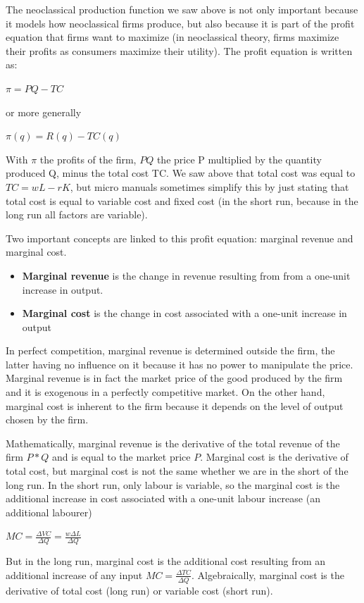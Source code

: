 \documentclass[
  letterpaper,
  DIV=11,
  numbers=noendperiod]{scrreprt}
\begin{document}
The neoclassical production function we saw above is not only important
because it models how neoclassical firms produce, but also because it is
part of the profit equation that firms want to maximize (in neoclassical
theory, firms maximize their profits as consumers maximize their
utility). The profit equation is written as:

\(\pi = PQ - TC\)

or more generally

\(\pi(q) = R(q) - TC(q)\)

With \(\pi\) the profits of the firm, \(PQ\) the price P multiplied by
the quantity produced Q, minus the total cost TC. We saw above that
total cost was equal to \(TC = wL -rK\), but micro manuals sometimes
simplify this by just stating that total cost is equal to variable cost
and fixed cost (in the short run, because in the long run all factors
are variable).

Two important concepts are linked to this profit equation: marginal
revenue and marginal cost.

\begin{itemize}
\item
  \textbf{Marginal revenue} is the change in revenue resulting from from
  a one-unit increase in output.
\item
  \textbf{Marginal cost} is the change in cost associated with a
  one-unit increase in output
\end{itemize}

In perfect competition, marginal revenue is determined outside the firm,
the latter having no influence on it because it has no power to
manipulate the price. Marginal revenue is in fact the market price of
the good produced by the firm and it is exogenous in a perfectly
competitive market. On the other hand, marginal cost is inherent to the
firm because it depends on the level of output chosen by the firm.

Mathematically, marginal revenue is the derivative of the total revenue
of the firm \(P*Q\) and is equal to the market price \(P\). Marginal
cost is the derivative of total cost, but marginal cost is not the same
whether we are in the short of the long run. In the short run, only
labour is variable, so the marginal cost is the additional increase in
cost associated with a one-unit labour increase (an additional labourer)

\(MC = \frac{\Delta{VC}}{\Delta{}{}Q} = \frac{w\Delta{}{}L}{\Delta{Q}}\)

But in the long run, marginal cost is the additional cost resulting from
an additional increase of any input
\(MC = \frac{\Delta{TC}}{\Delta{Q}}\). Algebraically, marginal cost is
the derivative of total cost (long run) or variable cost (short run).
\end{document}
